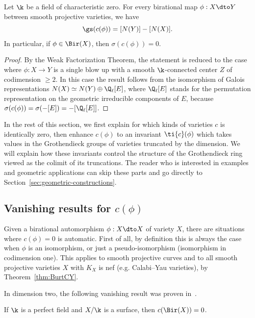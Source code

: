 \begin{proposition}
\notready\label{prop:Picnb}
Let $\k$ be a field
of characteristic zero.
For every birational map $\phi : X \dto Y$
between smooth projective
varieties,
we have
$$\gs(c(\phi)) = [N(Y)] - [N(X)].$$
In particular, if $\phi \in \Bir(X)$,
then $\sigma(c(\phi)) = 0$.
\end{proposition}
\begin{proof}

By the Weak Factorization Theorem,
the statement is reduced to the case where
$\phi: X \to Y$ is a single blow up
with a smooth
$\k$-connected center $Z$ of codimension $\ge 2$.
In this case
the result follows
from the isomorphism of Galois representations
$N(X) \simeq N(Y) \oplus \Q_\ell[E]$,
where $\Q_\ell[E]$ stands for the permutation
representation on the geometric irreducible components
of $E$, because $\sigma(c(\phi)) = \sigma(-[E]) = -[\Q_\ell[E]]$.
\end{proof}


In the rest of this section, we
first explain for which kinds of varieties
$c$ is identically zero,
then enhance $c(\phi)$ to
an invariant $\ti{c}(\phi)$
which takes values in the
Grothendieck groups of varieties truncated
by the dimension.
We will explain how these invariants control the structure
of the Grothendieck ring
viewed as the
colimit of its truncations.
The reader who is interested in examples and geometric applications
can skip these parts and go directly
to Section~\ref{sec:geometric-constructions}.


\subsection{Vanishing results for $c(\phi)$}


Given a birational automorphism
$\phi: X \dto X$ of variety $X$,
there are situations where $c(\phi) = 0$ is automatic.
First of all, by definition
this is always the case when $\phi$
is an isomorphism, or just a pseudo-isomorphism (isomorphism in codimension one).
This applies
to smooth projective curves
and to all
smooth projective varieties $X$
with $K_X$ is nef (e.g. Calabi--Yau varieties),
by
Theorem~\ref{thm:BurtCY}.

In dimension two,
the following vanishing result was proven in~\cite{LSZ20}.

\begin{theorem}
\notready\cite[Theorem 3.4]{LSZ20}
\label{thm:surfaces-main}
If $\k$ is a perfect field and
$X/\k$ is a surface,
then $c(\Bir(X)) = 0$.
\end{theorem}

